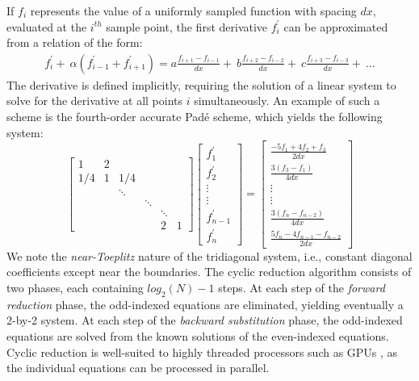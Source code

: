 \documentclass[letterpaper,10pt]{article}
\begin{document}
If $f_i$ represents the value of
a uniformly sampled function with spacing $dx$,
evaluated at the $i^{th}$ sample point,
the first derivative $f^{\prime}_i$ can be approximated from
a relation of the form:
%
\begin{equation}
\begin{split}
    f_i^{\prime} + \
    \alpha(f^{\prime}_{i-1} + f^{\prime}_{i+1})
    = 
    a\frac{f_{i+1} - f_{i-1}}{dx} + \
    b\frac{f_{i+2} - f_{i-2}}{dx} + \
    c\frac{f_{i+3} - f_{i-3}}{dx} + \
    \hdots
\end{split}
\label{eqn:general-compact}
\end{equation}
%
The derivative is defined implicitly,
requiring the solution of a linear system to solve for
the derivative at all points $i$ simultaneously.
An example of such a scheme is the fourth-order accurate
Pad\'{e} scheme, which yields the following system:
%
\begin{equation}
 \label{eqn:compact-tridiagonal-system}
 \begin{bmatrix}
     1&2\\
     1/4&1&1/4\\
     &&\ddots\\
     &&&\ddots\\
     &&&&\ddots\\
     &&&&2&1
  \end{bmatrix}
  \begin{bmatrix}
      f^{\prime}_1 \\
      f^{\prime}_2 \\
      \vdots \\
      \vdots \\
      f^{\prime}_{n-1} \\
      f^{\prime}_n
   \end{bmatrix}
 =
 \begin{bmatrix}
     \frac{-5f_1 + 4f_2 + f_3}{2dx}\\
     \frac{3(f_{3} - f_{1})}{4dx}\\
     \vdots\\
     \vdots\\
     \frac{3(f_{n} - f_{n-2})}{4dx}\\
     \frac{5f_{n} - 4f_{n-1} - f_{n-2}}{2dx}
  \end{bmatrix}
\end{equation}
%
We note the \emph{near-Toeplitz} nature of the tridiagonal system,
i.e., constant diagonal coefficients except near the boundaries.
The cyclic reduction algorithm consists of two phases,
each containing $log_2(N)-1$ steps.
At each step of the \emph{forward reduction} phase,
the odd-indexed equations are eliminated, yielding eventually
a 2-by-2 system.
At each step of the \emph{backward substitution} phase,
the odd-indexed equations are solved from the known solutions
of the even-indexed equations.
Cyclic reduction is well-suited to highly threaded processors
such as GPUs \cite{Zhang2010FTS},
as the individual equations can be processed in parallel.
\pagebreak
\end{document}
